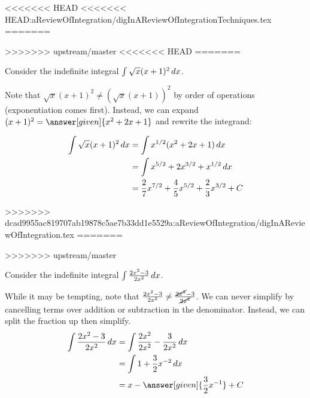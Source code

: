 \documentclass[nooutcomes]{ximera}
\begin{document}
<<<<<<< HEAD
<<<<<<< HEAD:aReviewOfIntegration/digInAReviewOfIntegrationTechniques.tex
=======

>>>>>>> upstream/master
%
%
%
<<<<<<< HEAD
=======
\begin{example}
Consider the indefinite integral $\int \sqrt{x}(x+1)^2 \mathop{}\!d x$.  

Note that $\sqrt{x}(x+1)^2 \neq (\sqrt{x}(x+1))^2$ by order of operations (exponentiation comes first). Instead, we can expand $(x+1)^2 = \answer[given]{x^2+2x+1}$ and rewrite the integrand:

\begin{align*}
\int \sqrt{x}(x+1)^2 \mathop{}\!d x &= \int x^{1/2} (x^2+2x+1) \mathop{}\!d x \\
&=  \int x^{5/2}+2x^{3/2}+x^{1/2} \mathop{}\!d x \\
&= \frac{2}{7} x^{7/2}+\frac{4}{5}x^{5/2}+\frac{2}{3}x^{3/2}+C
\end{align*}

\end{example}
>>>>>>> dcad9955ac819707ab19878c5ae7b33dd1e5529a:aReviewOfIntegration/digInAReviewOfIntegration.tex
=======

>>>>>>> upstream/master
 
\begin{example}
Consider the indefinite integral $\int \frac{2x^2-3}{2x^2} \mathop{}\!d x$.  

While it may be tempting, note that $\frac{2x^2-3}{2x^2} \neq \frac{\cancel{2x^2}-3}{\cancel{2x^2}}$.  We can never simplify by cancelling terms over addition or subtraction in the denominator.  Instead, we can split the fraction up then simplify.
\begin{align*}
\int \frac{2x^2-3}{2x^2} \d x &=\int \frac{2x^2}{2x^2}-\frac{3}{2x^2} \d x \\
&=  \int 1+\frac{3}{2}x^{-2} \d x \\
&= x- \answer[given]{\frac{3}{2}x^{-1}}+C
\end{align*}

\end{example}
\end{document}

